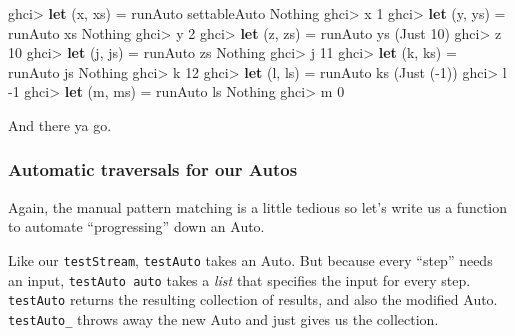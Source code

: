 \documentclass[]{article}
\newenvironment{Shaded}{\begin{snugshade}}{\end{snugshade}}
\newcommand{\DataTypeTok}[1]{\textcolor[rgb]{0.13,0.29,0.53}{#1}}
\newcommand{\DecValTok}[1]{\textcolor[rgb]{0.00,0.00,0.81}{#1}}
\newcommand{\FunctionTok}[1]{\textcolor[rgb]{0.00,0.00,0.00}{#1}}
\newcommand{\KeywordTok}[1]{\textcolor[rgb]{0.13,0.29,0.53}{\textbf{#1}}}
\newcommand{\NormalTok}[1]{#1}
\begin{document}
\begin{Shaded}
\begin{Highlighting}[]
\NormalTok{ghci}\FunctionTok{>} \KeywordTok{let}\NormalTok{ (x, xs) }\FunctionTok{=}\NormalTok{ runAuto settableAuto }\DataTypeTok{Nothing}
\NormalTok{ghci}\FunctionTok{>}\NormalTok{ x}
\DecValTok{1}
\NormalTok{ghci}\FunctionTok{>} \KeywordTok{let}\NormalTok{ (y, ys) }\FunctionTok{=}\NormalTok{ runAuto xs }\DataTypeTok{Nothing}
\NormalTok{ghci}\FunctionTok{>}\NormalTok{ y}
\DecValTok{2}
\NormalTok{ghci}\FunctionTok{>} \KeywordTok{let}\NormalTok{ (z, zs) }\FunctionTok{=}\NormalTok{ runAuto ys (}\DataTypeTok{Just} \DecValTok{10}\NormalTok{)}
\NormalTok{ghci}\FunctionTok{>}\NormalTok{ z}
\DecValTok{10}
\NormalTok{ghci}\FunctionTok{>} \KeywordTok{let}\NormalTok{ (j, js) }\FunctionTok{=}\NormalTok{ runAuto zs }\DataTypeTok{Nothing}
\NormalTok{ghci}\FunctionTok{>}\NormalTok{ j}
\DecValTok{11}
\NormalTok{ghci}\FunctionTok{>} \KeywordTok{let}\NormalTok{ (k, ks) }\FunctionTok{=}\NormalTok{ runAuto js }\DataTypeTok{Nothing}
\NormalTok{ghci}\FunctionTok{>}\NormalTok{ k}
\DecValTok{12}
\NormalTok{ghci}\FunctionTok{>} \KeywordTok{let}\NormalTok{ (l, ls) }\FunctionTok{=}\NormalTok{ runAuto ks (}\DataTypeTok{Just}\NormalTok{ (}\FunctionTok{-}\DecValTok{1}\NormalTok{))}
\NormalTok{ghci}\FunctionTok{>}\NormalTok{ l}
\FunctionTok{-}\DecValTok{1}
\NormalTok{ghci}\FunctionTok{>} \KeywordTok{let}\NormalTok{ (m, ms) }\FunctionTok{=}\NormalTok{ runAuto ls }\DataTypeTok{Nothing}
\NormalTok{ghci}\FunctionTok{>}\NormalTok{ m}
\DecValTok{0}
\end{Highlighting}
\end{Shaded}

And there ya go.

\hypertarget{automatic-traversals-for-our-autos}{%
\subsubsection{Automatic traversals for our
Autos}\label{automatic-traversals-for-our-autos}}

Again, the manual pattern matching is a little tedious so let's write us a
function to automate ``progressing'' down an Auto.

Like our \texttt{testStream}, \texttt{testAuto} takes an Auto. But because every
``step'' needs an input, \texttt{testAuto\ auto} takes a \emph{list} that
specifies the input for every step. \texttt{testAuto} returns the resulting
collection of results, and also the modified Auto. \texttt{testAuto\_} throws
away the new Auto and just gives us the collection.
\end{document}
